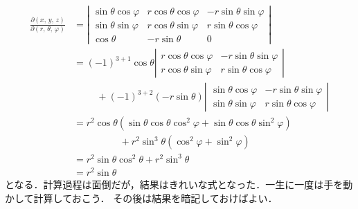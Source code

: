 \begin{align*}
\frac{ \partial (x, \, y, \, z) } { \partial (r, \, \theta , \, \varphi ) }
& = \left \lvert
\begin{array}{ccc}
\sin \theta \cos \varphi & r \cos \theta \cos \varphi & - r \sin \theta \sin \varphi \\
\sin \theta \sin \varphi & r \cos \theta \sin \varphi & r \sin \theta \cos \varphi \\
\cos \theta & -r \sin \theta & 0
\end{array}
\right \rvert \\
& = (-1)^{3+1} \cos \theta 
\left \lvert 
\begin{array}{cc}
r \cos \theta \cos \varphi & - r \sin \theta \sin \varphi \\
r \cos \theta \sin \varphi & r \sin \theta \cos \varphi 
\end{array}
\right \rvert \\
& \hspace{1cm} + (-1)^{3+2} ( - r \sin \theta ) 
\left \lvert 
\begin{array}{cc} 
\sin \theta \cos \varphi & - r \sin \theta \sin \varphi \\
\sin \theta \sin \varphi & r \sin \theta \cos \varphi 
\end{array}
\right \rvert \\
& = r^2 \cos \theta ( \sin \theta \cos \theta \cos ^2 \varphi 
+ \sin \theta \cos \theta \sin^2 \varphi ) \\ 
& \hspace{2cm} + r^2 \sin^3 \theta ( \cos ^2 \varphi + \sin ^2 \varphi ) \\
& = r^2 \sin \theta \cos ^2 \theta + r^2 \sin ^3 \theta \\
& = r^2 \sin \theta  
\end{align*}
となる．計算過程は面倒だが，結果はきれいな式となった．一生に一度は手を動かして計算しておこう．
その後は結果を暗記しておけばよい．

